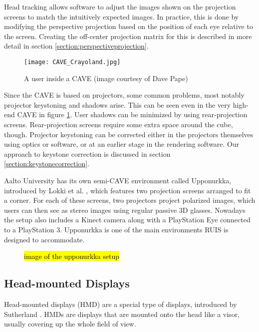 \documentclass[12pt,a4paper,oneside,pdftex]{report}
\begin{document}
Head tracking allows software to adjust the images shown on the projection screens to match the intuitively expected images. In practice, this is done by modifying the perspective projection based on the position of each eye relative to the screen. Creating the off-center projection matrix for this is described in more detail in section \ref{section:perspectiveprojection}.

\begin{figure}[h]
\centering
\texttt{[image: CAVE\_Crayoland.jpg]}
\caption{A user inside a CAVE (image courtesy of Dave Pape)}
\label{fig:CAVECrayoland}
\end{figure}

Since the CAVE is based on projectors, some common problems, most notably projector keystoning and shadows arise. This can be seen even in the very high-end CAVE in figure \ref{fig:CAVECrayoland}. User shadows can be minimized by using rear-projection screens. Rear-projection screens require some extra space around the cube, though. Projector keystoning can be corrected either in the projectors themselves using optics or software, or at an earlier stage in the rendering software. Our approach to keystone correction is discussed in section \ref{section:keystonecorrection}.

Aalto University has its own semi-CAVE environment called Upponurkka, introduced by Lokki et al. \cite{Upponurkka}, which features two projection screens arranged to fit a corner. For each of these screens, two projectors project polarized images, which users can then see as stereo images using regular passive 3D glasses. Nowadays the setup also includes a Kinect camera along with a PlayStation Eye connected to a PlayStation 3. Upponurkka is one of the main environments RUIS is designed to accommodate. 

\begin{figure}
\label{figure:upponurkka}
\hl{image of the upponurkka setup}
\end{figure}

\subsection{Head-mounted Displays}
\label{subsection:displayenvironments:hmd}

Head-mounted displays (HMD) are a special type of displays, introduced by Sutherland \cite{SutherlandHMD}. HMDs are displays that are mounted onto the head like a visor, usually covering up the whole field of view.
\end{document}
